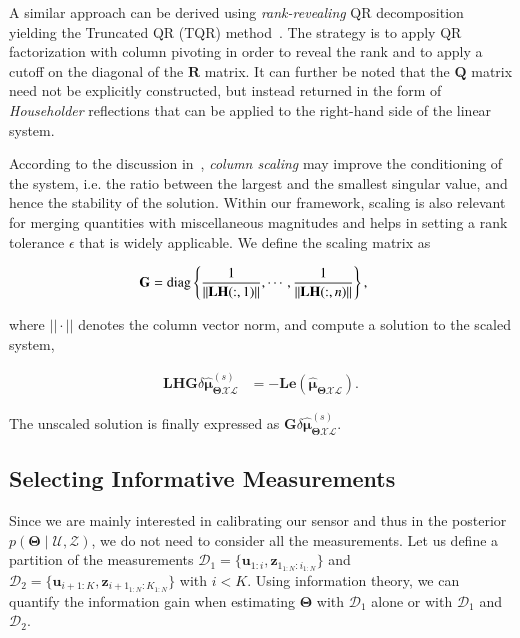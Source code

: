 A similar approach can be derived using \emph{rank-revealing} QR
decomposition~\cite{hong92rank} yielding the Truncated QR (TQR)
method~\cite{kitagawa01regularization}. The strategy is to apply QR
factorization with column pivoting in order to reveal the rank and to apply a
cutoff on the diagonal of the $\mathbf{R}$ matrix. It can further be noted that
the $\mathbf{Q}$ matrix need not be explicitly constructed, but instead returned
in the form of \emph{Householder} reflections that can be applied to the
right-hand side of the linear system.

According to the discussion in~\cite{golub96matrix}, \emph{column scaling} may
improve the conditioning of the system, i.e. the ratio between the largest and
the smallest singular value, and hence the stability of the solution. Within our
framework, scaling is also relevant for merging quantities with miscellaneous
magnitudes and helps in setting a rank tolerance $\epsilon$ that is widely
applicable. We define the scaling matrix as

\begin{equation}\label{eqn:scaling_matrix}
  \begin{aligned}
  \mathbf{G} &= \operatorname{diag}\left\{\frac{1}{||\mathbf{L}\mathbf{H}(:,1)||},\cdots,
    \frac{1}{||\mathbf{L}\mathbf{H}(:,n)||}\right\},
  \end{aligned}
\end{equation}

\noindent where $||\cdot||$ denotes the column vector norm, and compute a
solution to the scaled system,

\begin{equation}\label{eqn:scaled_system}
  \begin{aligned}
  \mathbf{L}\mathbf{H}\mathbf{G}
  \delta\hat{\boldsymbol{\mu}}_{\boldsymbol{\Theta}\mathcal{X}\mathcal{L}}^{(s)}
  &=
  -\mathbf{L}\mathbf{e}(\mathbf{\hat{\boldsymbol{\mu}}_{
  \boldsymbol{\Theta}\mathcal{X}\mathcal{L}}}).
  \end{aligned}
\end{equation}

\noindent The unscaled solution is finally expressed as $\mathbf{G}
\delta\hat{\boldsymbol{\mu}}_{\boldsymbol{\Theta}\mathcal{X}\mathcal{L}}^{(s)}$.

\subsection{Selecting Informative Measurements}

Since we are mainly interested in calibrating our sensor and thus in the
posterior $p(\boldsymbol{\Theta}\mid\mathcal{U},\mathcal{Z})$, we do not need
to consider all the measurements. Let us define a partition of the measurements
$\mathcal{D}_1=\{\mathbf{u}_{1:i}, \mathbf{z}_{1_{1:N}:i_{1:N}}\}$ and
$\mathcal{D}_2=\{\mathbf{u}_{i+1:K}, \mathbf{z}_{i+1_{1:N}:K_{1:N}}\}$ with
$i<K$. Using information theory, we can quantify the information gain when
estimating $\boldsymbol{\Theta}$ with $\mathcal{D}_1$ alone or with
$\mathcal{D}_1$ and $\mathcal{D}_2$.

